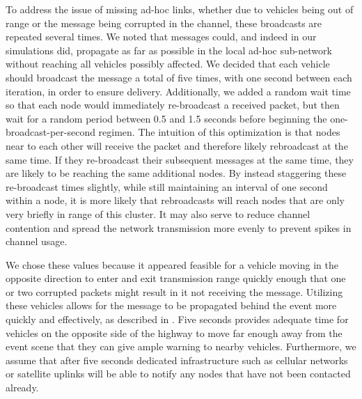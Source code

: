 \documentclass{IEEEtran}
\begin{document}
To address the issue of missing ad-hoc links, whether due to vehicles being out of range or the message being corrupted in the channel, these broadcasts are repeated several times.
We noted that messages could, and indeed in our simulations did, propagate as far as possible in the local ad-hoc sub-network without reaching all vehicles possibly affected.
We decided that each vehicle should broadcast the message a total of five times, with one second between each iteration, in order to ensure delivery.
Additionally, we added a random wait time so that each node would immediately re-broadcast a received packet, but then wait for a random period between 0.5 and 1.5 seconds before beginning the one-broadcast-per-second regimen.
The intuition of this optimization is that nodes near to each other will receive the packet and therefore likely rebroadcast at the same time.
If they re-broadcast their subsequent messages at the same time, they are likely to be reaching the same additional nodes.
By instead staggering these re-broadcast times slightly, while still maintaining an interval of one second within a node, it is more likely that rebroadcasts will reach nodes that are only very briefly in range of this cluster.
It may also serve to reduce channel contention and spread the network transmission more evenly to prevent spikes in channel usage.

We chose these values because it appeared feasible for a vehicle moving in the opposite direction to enter and exit transmission range quickly enough that one or two corrupted packets might result in it not receiving the message.
Utilizing these vehicles allows for the message to be propagated behind the event more quickly and effectively, as described in \cite{vanet_dissem}.
Five seconds provides adequate time for vehicles on the opposite side of the highway to move far enough away from the event scene that they can give ample warning to nearby vehicles.
Furthermore, we assume that after five seconds dedicated infrastructure such as cellular networks or satellite uplinks will be able to notify any nodes that have not been contacted already.
\end{document}
